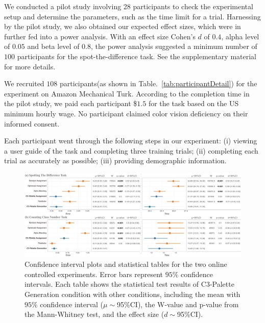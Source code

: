 \vspace{.3em}
We conducted a pilot study involving 28 participants to check the experimental setup and determine the parameters, such as the time limit for a trial.
Harnessing by the pilot study, we also obtained our expected effect sizes, which were in further fed into a power analysis. With an effect size Cohen's $d$ of $0.4$, alpha level of $0.05$ and beta level of $0.8$, the power analysis suggested a minimum number of $100$ participants for the spot-the-difference task. See the supplementary material for more details.

\vspace{.3em}
We recruited $108$ participants(as shown in Table.~\ref{tab:participantDetail}) for the experiment on Amazon Mechanical Turk.
According to the completion time in the pilot study, we paid each participant \$$1.5$ for the task based on the US minimum hourly wage.
No participant claimed color vision deficiency on their informed consent.

\vspace{.3em}
Each participant went through the following steps in our experiment: (i) viewing a user guide of the task and completing three training trials; (ii) completing each trial as accurately as possible; (iii) providing demographic information.

\begin{figure}[t]
\centering
\includegraphics[width=1\linewidth]{figures/user-result-formal.pdf}
\caption{Confidence interval plots and statistical tables for the two online controlled experiments. Error bars represent $95\%$ confidence intervals. Each table shows the statistical test results of C3-Palette Generation condition with other conditions, including the mean with $95\%$ confidence interval ($\mu\sim$95\%CI), the W-value and p-value from the Mann-Whitney test, and the effect size ($d\sim$95\%CI).
}
\vspace*{-3mm}
\label{fig:userResults}
\end{figure}


